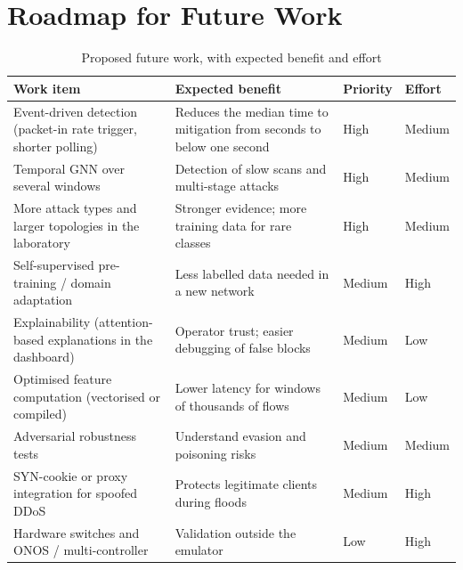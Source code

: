 \section{Roadmap for Future Work}
\begin{table}[htbp]
\centering
\caption{Proposed future work, with expected benefit and effort}
\label{tab:roadmap}
\small
\begin{tabularx}{\textwidth}{|p{4.2cm}|X|p{1.8cm}|p{1.6cm}|}
\hline
\textbf{Work item} & \textbf{Expected benefit} & \textbf{Priority} & \textbf{Effort} \\ \hline
Event-driven detection (packet-in rate trigger, shorter polling) & Reduces the median time to mitigation from seconds to below one second & High & Medium \\ \hline
Temporal GNN over several windows & Detection of slow scans and multi-stage attacks & High & Medium \\ \hline
More attack types and larger topologies in the laboratory & Stronger evidence; more training data for rare classes & High & Medium \\ \hline
Self-supervised pre-training / domain adaptation & Less labelled data needed in a new network & Medium & High \\ \hline
Explainability (attention-based explanations in the dashboard) & Operator trust; easier debugging of false blocks & Medium & Low \\ \hline
Optimised feature computation (vectorised or compiled) & Lower latency for windows of thousands of flows & Medium & Low \\ \hline
Adversarial robustness tests & Understand evasion and poisoning risks & Medium & Medium \\ \hline
SYN-cookie or proxy integration for spoofed DDoS & Protects legitimate clients during floods & Medium & High \\ \hline
Hardware switches and ONOS / multi-controller & Validation outside the emulator & Low & High \\ \hline
\end{tabularx}
\end{table}

